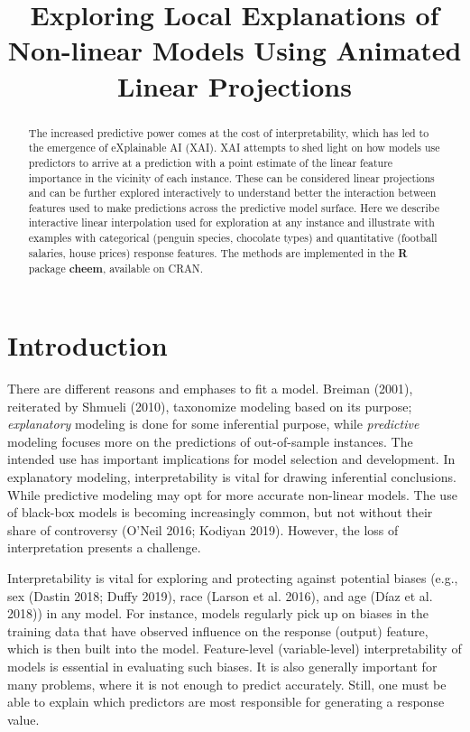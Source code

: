 \documentclass[
]{article}
\title{Exploring Local Explanations of Non-linear Models Using Animated Linear Projections}
\author{}
\date{\vspace{-2.5em}}
\begin{document}
\maketitle
\begin{abstract}
The increased predictive power comes at the cost of interpretability, which has led to the emergence of eXplainable AI (XAI). XAI attempts to shed light on how models use predictors to arrive at a prediction with a point estimate of the linear feature importance in the vicinity of each instance. These can be considered linear projections and can be further explored interactively to understand better the interaction between features used to make predictions across the predictive model surface. Here we describe interactive linear interpolation used for exploration at any instance and illustrate with examples with categorical (penguin species, chocolate types) and quantitative (football salaries, house prices) response features. The methods are implemented in the \textbf{R} package \textbf{cheem}, available on CRAN.
\end{abstract}

\hypertarget{sec:intro}{%
\section{Introduction}\label{sec:intro}}

There are different reasons and emphases to fit a model. Breiman (2001), reiterated by Shmueli (2010), taxonomize modeling based on its purpose; \emph{explanatory} modeling is done for some inferential purpose, while \emph{predictive} modeling focuses more on the predictions of out-of-sample instances. The intended use has important implications for model selection and development. In explanatory modeling, interpretability is vital for drawing inferential conclusions. While predictive modeling may opt for more accurate non-linear models. The use of black-box models is becoming increasingly common, but not without their share of controversy (O'Neil 2016; Kodiyan 2019). However, the loss of interpretation presents a challenge.

Interpretability is vital for exploring and protecting against potential biases (e.g., sex (Dastin 2018; Duffy 2019), race (Larson et al. 2016), and age (Díaz et al. 2018)) in any model. For instance, models regularly pick up on biases in the training data that have observed influence on the response (output) feature, which is then built into the model. Feature-level (variable-level) interpretability of models is essential in evaluating such biases. It is also generally important for many problems, where it is not enough to predict accurately. Still, one must be able to explain which predictors are most responsible for generating a response value.
\end{document}
